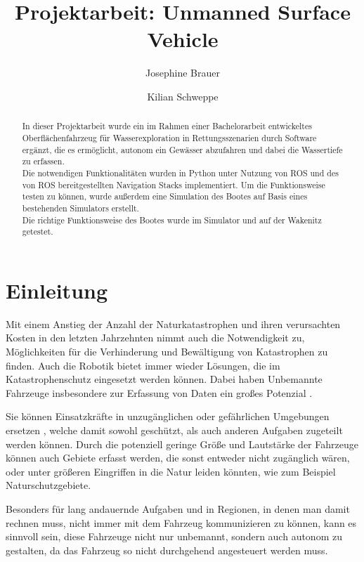 \documentclass[11pt]{article}
\begin{document}
\title{Projektarbeit: Unmanned Surface Vehicle}

\author{Josephine Brauer \and Kilian Schweppe}

\maketitle

\begin{abstract}
In dieser Projektarbeit wurde ein im Rahmen einer Bachelorarbeit entwickeltes Oberflächenfahrzeug für Wasserexploration in Rettungsszenarien durch Software ergänzt, die es ermöglicht, autonom ein Gewässer abzufahren und dabei die Wassertiefe zu erfassen.\\
Die notwendigen Funktionalitäten wurden in Python unter Nutzung von ROS und des von ROS bereitgestellten Navigation Stacks implementiert. Um die Funktionsweise testen zu können, wurde außerdem eine Simulation des Bootes auf Basis eines bestehenden Simulators erstellt.\\
Die richtige Funktionsweise des Bootes wurde im Simulator und auf der Wakenitz getestet.
\end{abstract}

\section{Einleitung}
Mit einem Anstieg der Anzahl der Naturkatastrophen und ihren verursachten Kosten in den letzten Jahrzehnten\cite{kellenberg} nimmt auch die Notwendigkeit zu, Möglichkeiten für die Verhinderung und Bewältigung von Katastrophen zu finden. Auch die Robotik bietet immer wieder Lösungen, die im Katastrophenschutz eingesetzt werden können. Dabei haben Unbemannte Fahrzeuge insbesondere zur Erfassung von Daten ein großes Potenzial \cite{surveyDisasterRobotics}.

Sie können Einsatzkräfte in unzugänglichen oder gefährlichen Umgebungen ersetzen \cite{bellingham}, welche damit sowohl geschützt, als auch anderen Aufgaben zugeteilt werden können. Durch die potenziell geringe Größe und Lautstärke der Fahrzeuge können auch Gebiete erfasst werden, die sonst entweder nicht zugänglich wären, oder unter größeren Eingriffen in die Natur leiden könnten, wie zum Beispiel Naturschutzgebiete.

Besonders für lang andauernde Aufgaben und in Regionen, in denen man damit rechnen muss, nicht immer mit dem Fahrzeug kommunizieren zu können, kann es sinnvoll sein, diese Fahrzeuge nicht nur unbemannt, sondern auch autonom zu gestalten, da das Fahrzeug so nicht durchgehend angesteuert werden muss.
\end{document}
